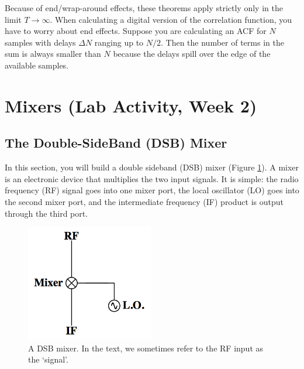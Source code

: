 \documentclass[11pt,preprint]{aastex}
\begin{document}
Because of end/wrap-around effects, these theorems apply
strictly only in the limit $T \rightarrow \infty$.
When calculating a digital version of the correlation function, you have
to worry about end effects. Suppose you are calculating an ACF for $N$
samples with delays $\Delta N$ ranging up to $N/2$. Then the number of
terms in the sum is always smaller than $N$ because the delays spill
over the edge of the available samples. 





\section{Mixers (Lab Activity, Week 2)} \label{mixersect}

\subsection{The Double-SideBand (DSB) Mixer} \label{sectdsb}

\noindent
In this section, you will build a double sideband (DSB) mixer (Figure \ref{dsb}).
A mixer is an electronic device that multiplies the two input signals. It is simple: the
radio frequency (RF) signal goes into one mixer port, the local oscillator (LO) goes into the second
mixer port, and the intermediate frequency (IF) product is output through the third port.

\begin{figure}[h!]
\begin{center}
  \includegraphics[height=2in]{dsbmixer.png}
\end{center}
\caption{\footnotesize A DSB mixer. In the text, we sometimes refer to
  the RF input as the `signal'. \label{dsb}}
\end{figure}
\end{document}
